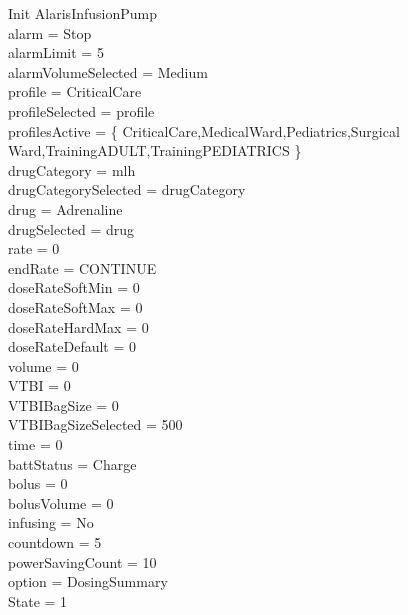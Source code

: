 \begin{schema}{Init}
	AlarisInfusionPump\\
	\where
	alarm = Stop\\
	alarmLimit = 5\\
	alarmVolumeSelected = Medium\\
	profile = CriticalCare\\
	\pagebreak
	profileSelected = profile\\
	profilesActive = \{ CriticalCare,MedicalWard,Pediatrics,Surgical\\
	Ward,TrainingADULT,TrainingPEDIATRICS \}\\
	drugCategory = mlh\\
	drugCategorySelected = drugCategory\\
	drug = Adrenaline\\
	drugSelected = drug\\
	rate = 0\\
	endRate = CONTINUE\\
	doseRateSoftMin = 0\\
	doseRateSoftMax = 0\\
	doseRateHardMax = 0\\
	doseRateDefault = 0\\
	volume = 0\\
	VTBI = 0\\
	VTBIBagSize = 0\\
	VTBIBagSizeSelected = 500\\
	time = 0\\
	battStatus = Charge\\
	bolus = 0\\
	bolusVolume = 0\\
	infusing = No\\
	countdown = 5\\
	powerSavingCount = 10\\
	option = DosingSummary\\
	State = 1\\
\end{schema}


